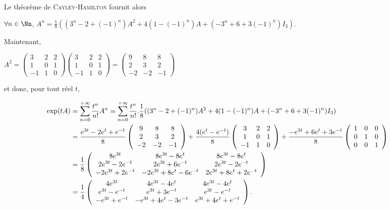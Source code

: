 {\begin{enumerate}
{Le théorème de \textsc{Cayley}-\textsc{Hamilton} fournit alors 

\begin{center}
$\forall n\in\Nn$, $A^n= \frac{1}{8}((3^n-2+(-1)^n)A^2+4(1-(-1)^n)A+(-3^n+6+3(-1)^n)I_3)$.
\end{center}

Maintenant,

\begin{center}
$A^2=\left(
\begin{array}{ccc}
3&2&2\\
1&0&1\\
-1&1&0
\end{array}
\right)\left(
\begin{array}{ccc}
3&2&2\\
1&0&1\\
-1&1&0
\end{array}
\right)=\left(
\begin{array}{ccc}
9&8&8\\
2&3&2\\
-2&-2&-1
\end{array}
\right)$
\end{center}

et donc, pour tout réel $t$,

\begin{align*}\ensuremath
\text{exp}(tA)&=\sum_{n=0}^{+\infty} \frac{t^n}{n!}A^n=\sum_{n=0}^{+\infty} \frac{t^n}{n!}. \frac{1}{8}((3^n-2+(-1)^n)A^2+4(1-(-1)^n)A+(-3^n+6+3(-1)^n)I_3)\\
 &= \frac{e^{3t}-2e^t+e^{-t}}{8}\left(
\begin{array}{ccc}
9&8&8\\
2&3&2\\
-2&-2&-1
\end{array}
\right)+ \frac{4(e^t-e^{-t})}{8}\left(
\begin{array}{ccc}
3&2&2\\
1&0&1\\
-1&1&0
\end{array}
\right)+ \frac{-e^{3t}+6e^t+3e^{-t}}{8}\left(
\begin{array}{ccc}
1&0&0\\
0&1&0\\
0&0&1
\end{array}
\right)\\
&= \frac{1}{8}\left(
\begin{array}{ccc}
8e^{3t}&8e^{3t}-8e^t&8e^{3t}-8e^t\\
2e^{3t}-2e^{-t}&2e^{3t}+6e^{-t}&2e^{3t}-2e^{-t}\\
-2e^{3t}+2e^{-t}&-2e^{3t}+8e^t-6e^{-t}&2e^{3t}+8e^t+2e^{-t}
\end{array}
\right)\\
 &= \frac{1}{4}\left(
\begin{array}{ccc}
4e^{3t}&4e^{3t}-4e^t&4e^{3t}-4e^t\\
e^{3t}-e^{-t}&e^{3t}+3e^{-t}&e^{3t}-e^{-t}\\
-e^{3t}+e^{-t}&-e^{3t}+4e^t-3e^{-t}&e^{3t}+4e^t+e^{-t}
\end{array}
\right).
\end{align*}

}
\end{enumerate}}
